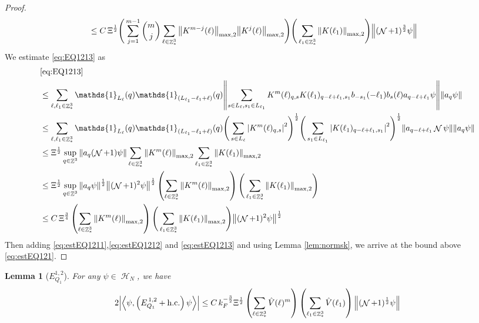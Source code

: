 \documentclass[sn-mathphys, Numbered ,a4paper]{sn-jnl}%
\DeclareMathOperator{\Z}{\mathbb{Z}}
\DeclareMathOperator{\HH}{\mathcal{H}}
\DeclareMathOperator{\NN}{\mathcal{N}}
\newcommand{\half}{\frac{1}{2}}
\newcommand{\eva}[1]{\left\langle #1 \right\rangle}
\theoremstyle{plain}
\newtheorem{lemma}[theorem]{Lemma}
\theoremstyle{definition}
\theoremstyle{remark}
\theoremstyle{plain}
\theoremstyle{definition}
\theoremstyle{remark}
\begin{document}
{\begin{proof}
\begin{alignat}{2}
	&\leq C\, \Xi^\half \Bigg(\sum\limits_{j=1}^{m-1} {{m}\choose j} \sum\limits_{\ell \in \Z^3_*} \norm{K^{m-j}(\ell)}_{ \mathrm{max,2} } \norm{K^{j}(\ell)}_{\mathrm{max,2}}\Bigg) \Bigg(\sum\limits_{ \ell_1\in \Z^3_*}\norm{  K(\ell_1)}_{\mathrm{max,2}}\Bigg)  \norm{(\NN+1)^\frac{3}{2} \psi} \label{eq:estEQ1212}
\end{alignat} 
We estimate \eqref{eq:EQ1213} as
\begin{align}
	&\eqref{eq:EQ1213}\nonumber\\
	&\leq\sum\limits_{\ell, \ell_1\in \Z^3_*} \mathds{1}_{L_{\ell}}(q)  \mathds{1}_{(L_{\ell_1}-\ell_1+\ell)}(q)  \norm{ \sum\limits_{s\in L_{\ell}, s_1 \in L_{\ell_1}} K^m(\ell)_{q,s}K(\ell_1)_{q-\ell+\ell_1,s_1} b_{-s_1}(-\ell_1) b_{s}(\ell) a_{q-\ell+\ell_1}\psi}\norm{ a_{q}\psi }\nonumber\\
	&\leq\sum\limits_{\ell, \ell_1\in \Z^3_*}  \mathds{1}_{L_{\ell}}(q) \mathds{1}_{(L_{\ell_1}-\ell_1+\ell)}(q) \Bigg(\sum\limits_{s \in L_{\ell}} \abs{K^m(\ell)_{q,s}}^2\Bigg)^\half \Bigg(\sum\limits_{s_1 \in L_{\ell_1}} \abs{K(\ell_1)_{q-\ell+\ell_1,s_1}}^2\Bigg)^\half \norm{ a_{q-\ell+\ell_1} \NN\psi} \norm{ a_{q}\psi }\nonumber\\
	&\leq \Xi^\half \sup_{q \in \Z^3}\norm{ a_{q} (\NN+1)\psi}\sum\limits_{\ell \in \Z^3_*} \norm{  K^{m}(\ell)}_{\mathrm{max,2}}  \sum\limits_{\ell_1 \in \Z^3_*} \norm{K(\ell_1)}_{\mathrm{max,2}} \nonumber\\
	&\leq  \Xi^\half  \sup_{q \in \Z^3}\norm{ a_{q} \psi}^\half \norm{ (\NN+1)^2\psi}^\half \left(\sum\limits_{\ell \in \Z^3_*} \norm{K^m(\ell)}_{\mathrm{max,2}}\right)\Bigg(\sum\limits_{\ell_1 \in \Z^3_*} \norm{K(\ell_1)}_{\mathrm{max,2}}\Bigg) \nonumber\\
	&\leq C\, \Xi^{\frac{3}{4}} \left(\sum\limits_{\ell \in \Z^3_*} \norm{K^m(\ell)}_{\mathrm{max,2}}\right)\Bigg(\sum\limits_{\ell_1 \in \Z^3_*} \norm{K(\ell_1)}_{\mathrm{max,2}} \Bigg)  \norm{ (\NN+1)^2\psi}^\half \label{eq:estEQ1213}
\end{align}
Then adding \eqref{eq:estEQ1211},\eqref{eq:estEQ1212} and \eqref{eq:estEQ1213} and using Lemma \ref{lem:normsk}, we arrive at the bound above \eqref{eq:estEQ121}.
\end{proof}}
\begin{lemma}[$E_{Q_1}^{1,2}$]
For any $\psi \in \HH_N$, we have
\begin{equation}
	2\abs{\eva{\psi,\left(E^{\,1,2}_{Q_1}+\mathrm{h.c.}\right) \psi }}\nonumber
	\leq C\, k_{F}^{-\frac{3}{2}} \Xi^{\half} \left(\sum\limits_{\ell\in \Z^3_*} \hat{V}(\ell)^m \right) \left(\sum\limits_{\ell_1\in \Z^3_*} \hat{V}(\ell_1) \right) \norm{(\NN+1)^\half \psi } \label{eq:estEQ112}
\end{equation}
\end{lemma}
\end{document}
